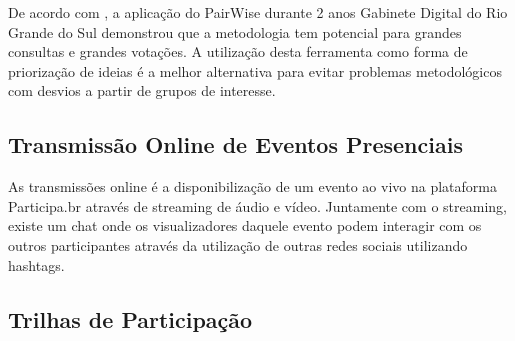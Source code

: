 De acordo com \cite{solagna2014metodologias}, a aplicação do PairWise durante 2 anos Gabinete Digital do Rio Grande do Sul demonstrou que a metodologia tem potencial para grandes consultas e grandes votações. A utilização desta ferramenta como forma de priorização de ideias é a melhor alternativa para evitar problemas metodológicos com desvios a partir de grupos de interesse.

\subsection{Transmissão Online de Eventos Presenciais}

As transmissões online é a disponibilização de um evento ao vivo na plataforma Participa.br através de streaming de áudio e vídeo. Juntamente com o streaming, existe um chat onde os visualizadores daquele evento podem interagir com os outros participantes através da utilização de outras redes sociais utilizando hashtags.

\subsection{Trilhas de Participação}















